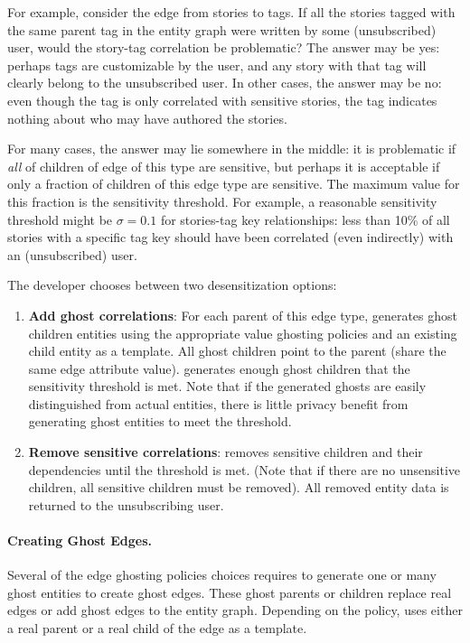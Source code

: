 For example, consider the edge from stories to tags. If all the stories tagged with the same parent
tag in the entity graph were written by some (unsubscribed) user, would the story-tag correlation be
problematic? The answer may be yes: perhaps tags are customizable by the user, and any story with
that tag will clearly belong to the unsubscribed user. In other cases, the answer may be no: even
though the tag is only correlated with sensitive stories, the tag indicates nothing about who may
have authored the stories.

For many cases, the answer may lie somewhere in the middle: it is problematic if \emph{all} of
children of edge of this type are sensitive, but perhaps it is acceptable if only a fraction of
children of this edge type are sensitive. The maximum value for this fraction is the sensitivity
threshold.  For example, a reasonable sensitivity threshold might be $\sigma = 0.1$ for stories-tag
key relationships: less than 10\% of all stories with a specific tag key should have been correlated
(even indirectly) with an (unsubscribed) user. 

The developer chooses between two desensitization options:
\begin{enumerate} 
    \item \textbf{Add ghost correlations}: For each parent of this edge type, \sys
            generates ghost children entities using the appropriate value ghosting policies and an
            existing child entity as a template. All ghost children point to the parent (share the
            same edge attribute value).  \sys generates enough ghost children that the sensitivity
            threshold is met.  Note that if the generated ghosts are easily distinguished from
            actual entities, there is little privacy benefit from generating ghost entities to meet
            the threshold.

\item \textbf{Remove sensitive correlations}: \sys removes sensitive children and their dependencies
    until the threshold is met. (Note that if there are no unsensitive children, all sensitive
    children must be removed). All removed entity data is returned to the unsubscribing user.
\end{enumerate}

\paragraph{Creating Ghost Edges.}
Several of the edge ghosting policies choices requires \sys to generate one or many ghost entities
to create ghost edges. These ghost parents or children replace real edges or add ghost edges to the
entity graph.  Depending on the policy, \sys uses either a real parent or a real child of the
edge as a template. 

